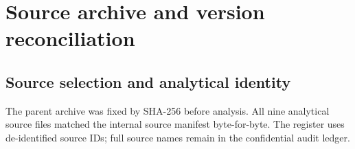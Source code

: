 \clearpage
\appendix
\renewcommand{\thetable}{\Alph{section}\arabic{table}}
\renewcommand{\theHtable}{appendix.\Alph{section}.\arabic{table}}
\begingroup
\small
\setlength{\parskip}{3pt}
\setlength{\emergencystretch}{1.8em}

\section{Source archive and version reconciliation}\label{app:source}
\setcounter{table}{0}

\subsection{Source selection and analytical identity}\label{app:source-register}
The parent archive was fixed by SHA-256 before analysis. All nine analytical source files matched the internal source manifest byte-for-byte. The register uses de-identified source IDs; full source names remain in the confidential audit ledger.

